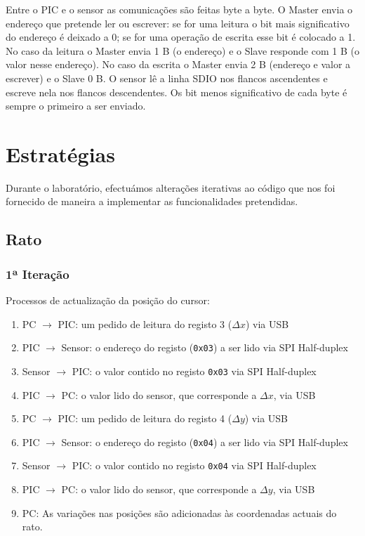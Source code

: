 \documentclass[a4paper]{article}
\begin{document}
Entre o PIC e o sensor as comunicações são feitas byte a byte. O Master envia o endereço que pretende ler ou escrever: se for uma leitura o bit mais significativo do endereço é deixado a 0; se for uma operação de escrita esse bit é colocado a 1. No caso da leitura o Master envia 1 B (o endereço) e o Slave responde com 1 B (o valor nesse endereço). No caso da escrita o Master envia 2 B (endereço e valor a escrever) e o Slave 0 B. O sensor lê a linha SDIO nos flancos ascendentes e escreve nela nos flancos descendentes. Os bit menos significativo de cada byte é sempre o primeiro a ser enviado.


\section{Estratégias}
Durante o laboratório, efectuámos alterações iterativas ao código que nos foi fornecido de maneira a implementar as funcionalidades pretendidas.

\subsection{Rato}

\subsubsection{1ª Iteração}
Processos de actualização da posição do cursor:
\begin{enumerate}
	\item PC $\rightarrow$ PIC: um pedido de leitura do registo 3 ($\Delta x$) via USB
	\item PIC $\rightarrow$ Sensor: o endereço do registo (\texttt{0x03}) a ser lido via SPI Half-duplex
	\item Sensor $\rightarrow$ PIC: o valor contido no registo \texttt{0x03} via SPI Half-duplex
	\item PIC $\rightarrow$ PC: o valor lido do sensor, que corresponde a $\Delta x$, via USB
	\item PC $\rightarrow$ PIC: um pedido de leitura do registo 4 ($\Delta y$) via USB
	\item PIC $\rightarrow$ Sensor: o endereço do registo (\texttt{0x04}) a ser lido via SPI Half-duplex
	\item Sensor $\rightarrow$ PIC: o valor contido no registo \texttt{0x04} via SPI Half-duplex
	\item PIC $\rightarrow$ PC: o valor lido do sensor, que corresponde a $\Delta y$, via USB
	\item PC: As variações nas posições são adicionadas às coordenadas actuais do rato.
\end{enumerate}
\end{document}
